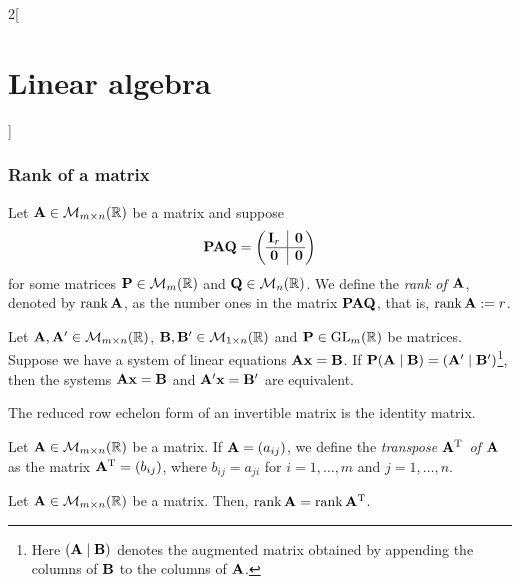 \documentclass[../../../main.tex]{subfiles}
\begin{document}
\begin{multicols}{2}[\section{Linear algebra}]
  \subsubsection*{Rank of a matrix}
  \begin{definition}[Rank]
    Let $\vb{A}\in\mathcal{M}_{m\times n}(\mathbb{R})$ be a matrix and suppose
    $$\mathblack{P}\mathblack{A}\mathblack{Q}=\left(
      \begin{array}{@{\,} c|c @{\,}}
          \mathblack{I}_r & \mathblack{0} \\
          \hline
          \mathblack{0}   & \mathblack{0}
        \end{array}
      \right)$$ for some matrices $\vb{P}\in\mathcal{M}_m(\mathbb{R})$ and $\vb{Q}\in\mathcal{M}_n(\mathbb{R})$. We define the \textit{rank of $\vb{A}$}, denoted by $\rank \vb{A}$, as the number ones in the matrix $\vb{P}\vb{A}\vb{Q}$, that is, $\rank\vb{A}:=r$.
  \end{definition}
  \begin{prop}
    Let $\vb{A},\vb{A}'\in\mathcal{M}_{m\times n}(\mathbb{R})$, $\vb{B},\vb{B}'\in\mathcal{M}_{1\times n}(\mathbb{R})$ and $\vb{P}\in\mathrm{GL}_m(\mathbb{R})$ be matrices. Suppose we have a system of linear equations $\vb{A}\vb{x}=\vb{B}$. If $\vb{P}(\vb{A}\mid\vb{B})=(\vb{A}'\mid\vb{B}')$\footnote{Here $(\vb{A}\mid\vb{B})$ denotes the augmented matrix obtained by appending the columns of $\vb{B}$ to the columns of $\vb{A}$.}, then the systems $\vb{A}\vb{x}=\vb{B}$ and $\vb{A}'\vb{x}=\vb{B}'$ are equivalent.
  \end{prop}
  \begin{corollary}
    The reduced row echelon form of an invertible matrix is the identity matrix.
  \end{corollary}
  \begin{definition}[Transposition]
    Let $\vb{A}\in\mathcal{M}_{m\times n}(\mathbb{R})$ be a matrix. If $\vb{A}=(a_{ij})$, we define the \textit{transpose $\vb{A}^{\mathrm{T}}$ of $\vb{A}$} as the matrix $\vb{A}^{\mathrm{T}}=(b_{ij})$, where $b_{ij}=a_{ji}$ for $i=1,\ldots,m$ and $j=1,\ldots,n$.
  \end{definition}
  \begin{prop}
    Let $\vb{A}\in\mathcal{M}_{m\times n}(\mathbb{R})$ be a matrix. Then, $\rank \vb{A}=\rank\vb{A}^{\mathrm{T}}$.
  \end{prop}

\end{multicols}
\end{document}
